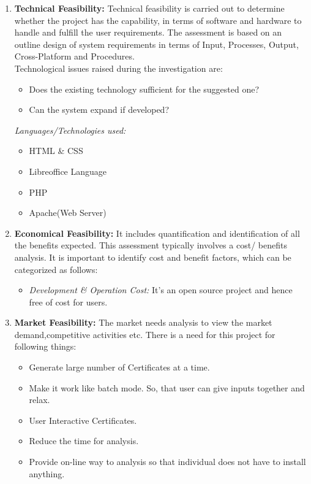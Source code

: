\begin{enumerate}
	\item \textbf{Technical Feasibility:} Technical feasibility is carried out to determine whether the project has the capability, in terms of software and hardware to handle and fulfill the user requirements. The assessment is based on an outline design of system requirements in terms of Input, Processes, Output, Cross-Platform and Procedures.\\
Technological issues raised during the investigation are:
\begin{itemize}
	\item Does the existing technology sufficient for the suggested one?
	\item Can the system expand if developed?
\end{itemize}
  \emph{Languages/Technologies used:}
\begin{itemize}
\item HTML \& CSS
\item Libreoffice Language
\item PHP
\item Apache(Web Server)
  \end{itemize}      
	\item \textbf{Economical Feasibility:} It includes quantification and identification of all the benefits expected. This assessment typically involves a cost/ benefits analysis. It is important to identify cost and benefit factors, which can be categorized as follows:
\begin{itemize}
\item  \emph{Development \& Operation Cost:} It's an open source project and hence free of cost for users.
\end{itemize}
	\item \textbf{Market Feasibility:} The market needs analysis to view the market demand,competitive activities etc. There is a need for this project for following things:
\begin{itemize}
\item  Generate large number of Certificates at a time.
\item  Make it work like batch mode. So, that user can give inputs together and relax.
\item  User Interactive Certificates.
\item Reduce the time for analysis.
\item Provide on-line way to analysis so that individual does not have to install anything.
\end{itemize}

\end{enumerate}
